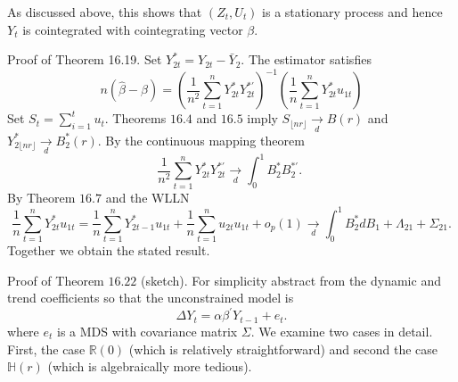 \documentclass[10pt]{article}
\begin{document}
As discussed above, this shows that $\left(Z_{t}, U_{t}\right)$ is a stationary process and hence $Y_{t}$ is cointegrated with cointegrating vector $\beta$.

Proof of Theorem 16.19. Set $Y_{2 t}^{*}=Y_{2 t}-\bar{Y}_{2}$. The estimator satisfies
$$
n(\widehat{\beta}-\beta)=\left(\frac{1}{n^{2}} \sum_{t=1}^{n} Y_{2 t}^{*} Y_{2 t}^{* \prime}\right)^{-1}\left(\frac{1}{n} \sum_{t=1}^{n} Y_{2 t}^{*} u_{1 t}\right)
$$
Set $S_{t}=\sum_{i=1}^{t} u_{t}$. Theorems $16.4$ and $16.5$ imply $S_{\lfloor n r\rfloor} \underset{d}{\longrightarrow} B(r)$ and $Y_{2\lfloor n r\rfloor}^{*} \underset{d}{\longrightarrow} B_{2}^{*}(r)$. By the continuous mapping theorem
$$
\frac{1}{n^{2}} \sum_{t=1}^{n} Y_{2 t}^{*} Y_{2 t}^{* \prime} \underset{d}{\longrightarrow} \int_{0}^{1} B_{2}^{*} B_{2}^{* \prime} \text {. }
$$
By Theorem $16.7$ and the WLLN
$$
\frac{1}{n} \sum_{t=1}^{n} Y_{2 t}^{*} u_{1 t}=\frac{1}{n} \sum_{t=1}^{n} Y_{2 t-1}^{*} u_{1 t}+\frac{1}{n} \sum_{t=1}^{n} u_{2 t} u_{1 t}+o_{p}(1) \underset{d}{\longrightarrow} \int_{0}^{1} B_{2}^{*} d B_{1}+\Lambda_{21}+\Sigma_{21} .
$$
Together we obtain the stated result.

Proof of Theorem $16.22$ (sketch). For simplicity abstract from the dynamic and trend coefficients so that the unconstrained model is
$$
\Delta Y_{t}=\alpha \beta^{\prime} Y_{t-1}+e_{t} .
$$
where $e_{t}$ is a MDS with covariance matrix $\Sigma$. We examine two cases in detail. First, the case $\mathbb{R}(0)$ (which is relatively straightforward) and second the case $\mathbb{H}(r)$ (which is algebraically more tedious).
\end{document}
